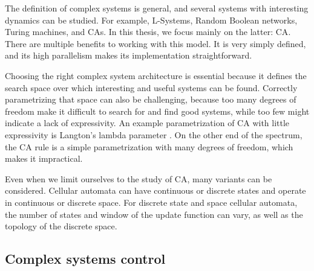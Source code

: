 The definition of complex systems is general, and several systems with
interesting dynamics can be studied. For example, L-Systems, Random Boolean
networks, Turing machines, and \Acfp{CA}. In this thesis, we focus mainly on the
latter: \acl{CA}. There are multiple benefits to working with this model. It is
very simply defined, and its high parallelism makes its implementation
straightforward.

Choosing the right complex system architecture is essential because it defines
the search space over which interesting and useful systems can be found.
Correctly parametrizing that space can also be challenging, because too many
degrees of freedom make it difficult to search for and find good systems, while
too few might indicate a lack of expressivity. An example parametrization of
\ac{CA} with little expressivity is Langton's lambda parameter
\parencite{langtonComputationEdgeChaos1990}. On the other end of the spectrum, the
\ac{CA} rule is a simple parametrization with many degrees of freedom, which
makes it impractical.

Even when we limit ourselves to the study of \ac{CA}, many variants can be
considered. Cellular automata can have continuous or discrete states and operate
in continuous or discrete space. For discrete state and space cellular automata,
the number of states and window of the update function can vary, as well as the
topology of the discrete space.


\subsection{Complex systems control}\label{sec:compl-syst-contr}

